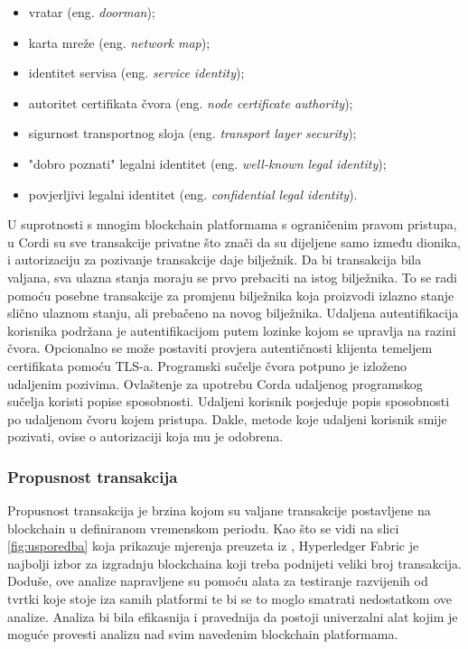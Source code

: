 \documentclass[times, utf8, diplomski]{fer}
\begin{document}
\begin{itemize}

\item vratar (eng.  \textit{doorman});

\item karta mreže (eng.  \textit{network map});

\item identitet servisa (eng. \textit{service identity});

\item autoritet certifikata čvora (eng.  \textit{node certificate authority});

\item sigurnost transportnog sloja (eng.  \textit{transport layer security});

\item "dobro poznati" legalni identitet (eng. \textit{well-known legal identity});

\item povjerljivi legalni identitet (eng.  \textit{confidential legal identity}).

\end{itemize}

U suprotnosti s mnogim blockchain platformama s ograničenim pravom pristupa, u Cordi su sve transakcije privatne što znači da su dijeljene samo između dionika, i autorizaciju za pozivanje transakcije daje bilježnik. Da bi transakcija bila valjana, sva ulazna stanja moraju se prvo prebaciti na istog bilježnika. To se radi pomoću posebne transakcije za promjenu bilježnika koja proizvodi izlazno stanje slično ulaznom stanju,  ali prebačeno na novog bilježnika. 
Udaljena autentifikacija korisnika podržana je autentifikacijom putem lozinke kojom se upravlja na razini čvora. Opcionalno se može postaviti provjera autentičnosti klijenta temeljem certifikata pomoću TLS-a. Programski sučelje čvora potpuno je izloženo udaljenim pozivima. Ovlaštenje za upotrebu Corda udaljenog programskog sučelja koristi popise sposobnosti. Udaljeni korisnik posjeduje popis sposobnosti po udaljenom čvoru kojem pristupa. Dakle, metode koje udaljeni korisnik smije pozivati, ovise o autorizaciji koja mu je odobrena.

\subsubsection{Propusnost transakcija}

Propusnost transakcija je brzina kojom su valjane transakcije postavljene na blockchain u definiranom vremenskom periodu. Kao što se vidi na slici \ref{fig:usporedba} koja prikazuje mjerenja preuzeta iz \citep{9411380}, Hyperledger Fabric je najbolji izbor za izgradnju blockchaina koji treba podnijeti veliki broj transakcija. Doduše, ove analize napravljene su pomoću alata za testiranje razvijenih od tvrtki koje stoje iza samih platformi te bi se to moglo smatrati nedostatkom ove analize. Analiza bi bila efikasnija i pravednija da postoji univerzalni alat kojim je moguće provesti analizu nad svim navedenim blockchain platformama.
\end{document}
